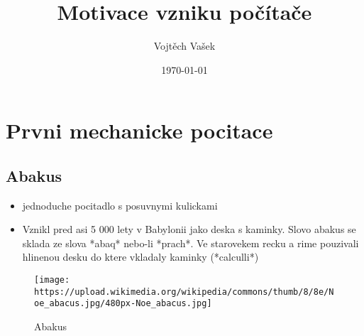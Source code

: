 \documentclass[a4paper,12pt]{article}
\title{Motivace vzniku počítače}
\author{Vojtěch Vašek}
\date{\today}
\begin{document}
\maketitle
\newpage

\section{Prvni mechanicke pocitace}
\subsection{Abakus}
\begin{itemize}
  \item jednoduche pocitadlo s posuvnymi kulickami
  \item Vznikl pred asi 5 000 lety v Babylonii jako deska s kaminky. Slovo abakus se sklada ze slova *abaq* nebo-li *prach*. Ve starovekem recku a rime pouzivali hlinenou desku do ktere vkladaly kaminky (*calculli*)
\end{itemize}
\begin{figure}[htp]
\texttt{[image: https://upload.wikimedia.org/wikipedia/commons/thumb/8/8e/Noe\_abacus.jpg/480px-Noe\_abacus.jpg]}
\caption{Abakus}
\end{figure}
\end{document}
